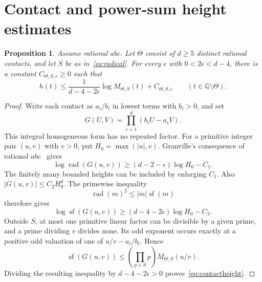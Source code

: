 \documentclass[11pt,a4paper]{article}
\newtheorem{proposition}[theorem]{Proposition}
\theoremstyle{remark}\newtheorem{remark}[theorem]{Remark}
\newcommand{\Q}{\mathbb Q}\newcommand{\Z}{\mathbb Z}
\DeclareMathOperator{\rad}{rad}
\DeclareMathOperator{\sfpart}{sf}
\begin{document}
\section{Contact and power-sum height estimates}

\begin{proposition}\label{prop:contacts}
Assume rational $abc$. Let $\Theta$ consist of $d\ge5$ distinct
rational contacts, and let $S$ be as in~\eqref{eq:radical}.
For every $\epsilon$ with $0<2\epsilon<d-4$, there is a
constant $C_{\Theta,S,\epsilon}\ge0$ such that
\begin{equation}\label{eq:contactheight}
 h(t)\le\frac{1}{d-4-2\epsilon}\log M_{\Theta,S}(t)
                   +C_{\Theta,S,\epsilon}
 \qquad(t\in\Q\setminus\Theta).
\end{equation}
\end{proposition}
\begin{proof}
Write each contact as $a_i/b_i$ in lowest terms with $b_i>0$,
and set
\[
                   G(U,V)=\prod_{i=1}^d(b_iU-a_iV).
\]
This integral homogeneous form has no repeated factor.
For a primitive integer pair $(u,v)$ with $v>0$, put
$H_0=\max(|u|,v)$. Granville's consequence of rational
$abc$~\cite[Proposition~1]{Granville} gives
\[
             \log\rad(G(u,v))\ge(d-2-\epsilon)\log H_0-C_1.
\]
The finitely many bounded heights can be included by enlarging
$C_1$. Also $|G(u,v)|\le C_2H_0^d$. The primewise inequality
\[
                       \rad(m)^2\le |m|\sfpart(m)
\]
therefore gives
\[
 \log\sfpart(G(u,v))\ge(d-4-2\epsilon)\log H_0-C_3.
\]
Outside $S$, at most one primitive linear factor can be
divisible by a given prime, and a prime dividing $v$ divides
none. Its odd exponent occurs exactly at a positive odd
valuation of one of $u/v-a_i/b_i$. Hence
\[
 \sfpart(G(u,v))\le\left(\prod_{p\in S}p\right)M_{\Theta,S}(u/v).
\]
Dividing the resulting inequality by $d-4-2\epsilon>0$
proves~\eqref{eq:contactheight}.
\end{proof}
\end{document}
